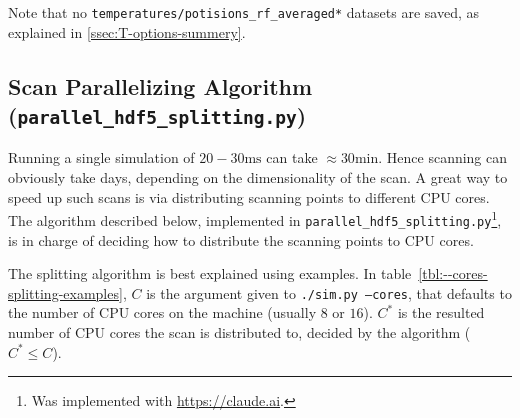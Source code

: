 Note that no \texttt{temperatures/potisions\_rf\_averaged*} datasets are saved, as explained in \ref{ssec:T-options-summery}.

\subsection{Scan Parallelizing Algorithm (\texttt{parallel\_hdf5\_splitting.py})}\label{ssec:manual/parallelized-simulating}

Running a single simulation of $20-30\mathrm{ms}$ can take $\approx 30 \mathrm{min}$. Hence scanning can obviously take days, depending on the dimensionality of the scan. A great way to speed up such scans is via distributing scanning points to different CPU cores. The algorithm described below, implemented in \texttt{parallel\_hdf5\_splitting.py}\footnote{Was implemented with \url{https://claude.ai}.}, is in charge of deciding how to distribute the scanning points to CPU cores.

The splitting algorithm is best explained using examples. In table~\ref{tbl:--cores-splitting-examples}, $C$ is the argument given to \texttt{./sim.py --cores}, that defaults to the number of CPU cores on the machine (usually $8$ or $16$). $C^*$ is the resulted number of CPU cores the scan is distributed to, decided by the algorithm ($C^* \leq C$).


